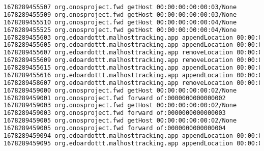 \documentclass[a4paper,10pt]{memoir}
\begin{document}
\begin{lstlisting}[language=bash]
1678289455507 org.onosproject.fwd getHost 00:00:00:00:00:03/None
1678289455509 org.onosproject.fwd getHost 00:00:00:00:00:03/None
1678289455510 org.onosproject.fwd getHost 00:00:00:00:00:04/None
1678289455525 org.onosproject.fwd getHost 00:00:00:00:00:04/None
1678289455603 org.edoardottt.malhosttracking.app appendLocation 00:00:00:00:00:03/None of:0000000000000001/1
1678289455605 org.edoardottt.malhosttracking.app appendLocation 00:00:00:00:00:01/None of:0000000000000003/1
1678289455607 org.edoardottt.malhosttracking.app removeLocation 00:00:00:00:00:01/None of:0000000000000001/1
1678289455609 org.edoardottt.malhosttracking.app removeLocation 00:00:00:00:00:03/None of:0000000000000003/1
1678289455615 org.edoardottt.malhosttracking.app appendLocation 00:00:00:00:00:04/None of:0000000000000002/1
1678289455616 org.edoardottt.malhosttracking.app appendLocation 00:00:00:00:00:02/None of:0000000000000004/1
1678289458607 org.edoardottt.malhosttracking.app removeLocation 00:00:00:00:00:04/None of:0000000000000004/1
1678289459000 org.onosproject.fwd getHost 00:00:00:00:00:02/None
1678289459001 org.onosproject.fwd forward of:0000000000000002
1678289459003 org.onosproject.fwd getHost 00:00:00:00:00:02/None
1678289459003 org.onosproject.fwd forward of:0000000000000003
1678289459005 org.onosproject.fwd getHost 00:00:00:00:00:02/None
1678289459005 org.onosproject.fwd forward of:0000000000000004
1678289459094 org.edoardottt.malhosttracking.app appendLocation 00:00:00:00:00:03/None of:0000000000000003/1
1678289459095 org.edoardottt.malhosttracking.app appendLocation 00:00:00:00:00:01/None of:0000000000000001/1
\end{lstlisting}
\end{document}
